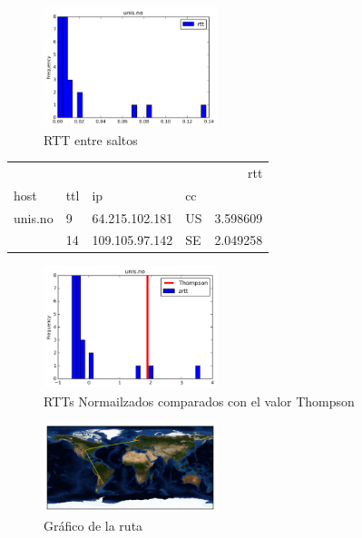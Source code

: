 \begin{figure}[H]
  \centering
    \includegraphics[width=0.45\textwidth]{histogramas_rtt/unis-no.png}
  \caption{RTT entre saltos}
  \label{entropia-s}
\end{figure}

\begin{center}

\begin{tabular}{llllr}
\toprule
        &    &                &    &       rtt \\
host & ttl & ip & cc &           \\
\midrule
unis.no & 9  & 64.215.102.181 & US &  3.598609 \\
        & 14 & 109.105.97.142 & SE &  2.049258 \\
\bottomrule
\end{tabular}

\end{center}

\begin{figure}[H]
  \centering
    \includegraphics[width=0.45\textwidth]{histogramas_thompson/unis-no.png}
  \caption{RTTs Normailzados comparados con el valor Thompson}
  \label{entropia-s}
\end{figure}

\begin{figure}[H]
  \centering
    \includegraphics[width=0.45\textwidth]{grafico-rutas/unis-no.png}
  \caption{Gráfico de la ruta}
  \label{entropia-s}
\end{figure}




